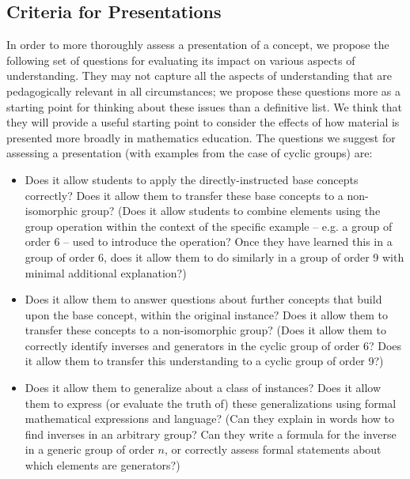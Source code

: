 \documentclass[man,10pt]{apa6}
\begin{document}
\subsection{Criteria for Presentations}
In order to more thoroughly assess a presentation of a concept, we propose the following set of questions for evaluating its impact on various aspects of understanding. They may not capture all the aspects of understanding that are pedagogically relevant in all circumstances; we propose these questions more as a starting point for thinking about these issues than a definitive list. We think that they will provide a useful starting point to consider the effects of how material is presented more broadly in mathematics education. The questions we suggest for assessing a presentation (with examples from the case of cyclic groups) are:
\begin{itemize}
\item Does it allow students to apply the directly-instructed base concepts correctly? Does it allow them to transfer these base concepts to a non-isomorphic group? (Does it allow students to combine elements using the group operation within the context of the specific example -- e.g. a group of order 6 -- used to introduce the operation? Once they have learned this in a group of order 6, does it allow them to do similarly in a group of order 9 with minimal additional explanation?) 
\item Does it allow them to answer questions about further concepts that build upon the base concept, within the original instance? Does it allow them to transfer these concepts to a non-isomorphic group? (Does it allow them to correctly identify inverses and generators in the cyclic group of order 6? Does it allow them to transfer this understanding to a cyclic group of order 9?)
\item Does it allow them to generalize about a class of instances? Does it allow them to express (or evaluate the truth of) these generalizations using formal mathematical expressions and language? (Can they explain in words how to find inverses in an arbitrary group? Can they write a formula for the inverse in a generic group of order $n$, or correctly assess formal statements about which elements are generators?)
\end{itemize}
\end{document}
